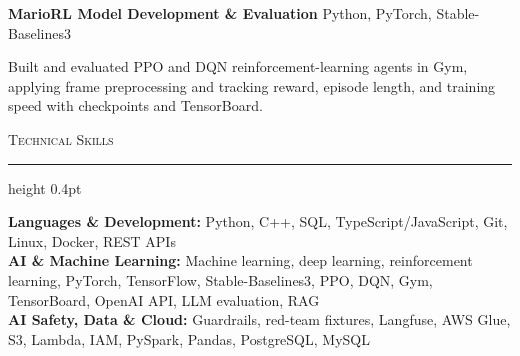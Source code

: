 \documentclass[letterpaper,11pt]{article}
\newcommand{\resumesection}[1]{%
  \par\vspace{2pt}%
  {\large\scshape #1}\par\vspace{2pt}%
  \hrule height 0.4pt\vspace{2pt}%
}
\newcommand{\projectHeading}[2]{
  \textbf{#1} \hfill #2
}
\begin{document}
\projectHeading{MarioRL Model Development \& Evaluation}{Python, PyTorch, Stable-Baselines3}
\begin{tightitemize}
  \item Built and evaluated PPO and DQN reinforcement-learning agents in Gym, applying frame preprocessing and tracking reward, episode length, and training speed with checkpoints and TensorBoard.
\end{tightitemize}

\resumesection{Technical Skills}
\textbf{Languages \& Development:} Python, C++, SQL, TypeScript/JavaScript, Git, Linux, Docker, REST APIs\\
\textbf{AI \& Machine Learning:} Machine learning, deep learning, reinforcement learning, PyTorch, TensorFlow, Stable-Baselines3, PPO, DQN, Gym, TensorBoard, OpenAI API, LLM evaluation, RAG\\
\textbf{AI Safety, Data \& Cloud:} Guardrails, red-team fixtures, Langfuse, AWS Glue, S3, Lambda, IAM, PySpark, Pandas, PostgreSQL, MySQL
\end{document}
